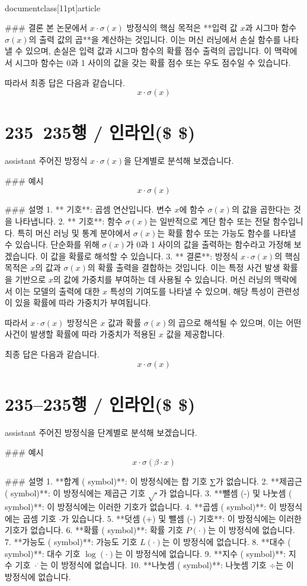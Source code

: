 \\documentclass[11pt]{article}
\begin{document}
### 결론
본 논문에서 \(x \cdot \sigma(x)\) 방정식의 핵심 목적은 **입력 값 \(x\)과 시그마 함수 \(\sigma(x)\)의 출력 값의 곱**을 계산하는 것입니다. 이는 머신 러닝에서 손실 함수를 나타낼 수 있으며, 손실은 입력 값과 시그마 함수의 확률 점수 출력의 곱입니다. 이 맥락에서 시그마 함수는 0과 1 사이의 값을 갖는 확률 점수 또는 우도 점수일 수 있습니다.

따라서 최종 답은 다음과 같습니다.
\[ \boxed{x \cdot \sigma(x)} \]

\section*{235~235행 / 인라인(\$ \$) }
assistant
주어진 방정식 \( x \cdot \sigma(x) \)을 단계별로 분석해 보겠습니다.

### 예시
\[ x \cdot \sigma(x) \]

### 설명
1. ** 기호**: 곱셈 연산입니다. 변수 \( x \)에 함수 \( \sigma(x) \)의 값을 곱한다는 것을 나타냅니다.
2. ** 기호**: 함수 \( \sigma(x) \)는 일반적으로 계단 함수 또는 전달 함수입니다. 특히 머신 러닝 및 통계 분야에서 \( \sigma(x) \)는 확률 함수 또는 가능도 함수를 나타낼 수 있습니다. 단순화를 위해 \( \sigma(x) \)가 0과 1 사이의 값을 출력하는 함수라고 가정해 보겠습니다. 이 값을 확률로 해석할 수 있습니다.
3. ** 결론**: 방정식 \( x \cdot \sigma(x) \)의 핵심 목적은 \( x \)의 값과 \( \sigma(x) \)의 확률 출력을 결합하는 것입니다. 이는 특정 사건 발생 확률을 기반으로 \( x \)의 값에 가중치를 부여하는 데 사용될 수 있습니다. 머신 러닝의 맥락에서 이는 모델의 출력에 대한 \( x \) 특성의 기여도를 나타낼 수 있으며, 해당 특성이 관련성이 있을 확률에 따라 가중치가 부여됩니다.

따라서 \( x \cdot \sigma(x) \) 방정식은 \( x \) 값과 확률 \( \sigma(x) \)의 곱으로 해석될 수 있으며, 이는 어떤 사건이 발생할 확률에 따라 가중치가 적용된 \( x \) 값을 제공합니다.

최종 답은 다음과 같습니다.
\[ \boxed{x \cdot \sigma(x)} \]

\section*{235–235행 / 인라인(\$ \$) }
assistant
주어진 방정식을 단계별로 분석해 보겠습니다.

### 예시
\[ x \cdot \sigma(\beta \cdot x) \]

### 설명
1. **합계 ( symbol)**: 이 방정식에는 합 기호 ∑가 없습니다.
2. **제곱근 ( symbol)**: 이 방정식에는 제곱근 기호 \(\sqrt{\cdot}\)가 없습니다.
3. **뺄셈 (-) 및 나눗셈 ( symbol)**: 이 방정식에는 이러한 기호가 없습니다.
4. **곱셈 ( symbol)**: 이 방정식에는 곱셈 기호 \(\cdot\)가 있습니다.
5. **덧셈 (+) 및 뺄셈 (-) 기호**: 이 방정식에는 이러한 기호가 없습니다.
6. **확률 ( symbol)**: 확률 기호 \(P(\cdot)\)는 이 방정식에 없습니다.
7. **가능도 ( symbol)**: 가능도 기호 \(L(\cdot)\)는 이 방정식에 없습니다.
8. **대수 ( symbol)**: 대수 기호 \(\log(\cdot)\)는 이 방정식에 없습니다.
9. **지수 ( symbol)**: 지수 기호 \(\cdot^{\cdot}\)는 이 방정식에 없습니다.
10. **나눗셈 ( symbol)**: 나눗셈 기호 \(\div\)는 이 방정식에 없습니다.
\end{document}
